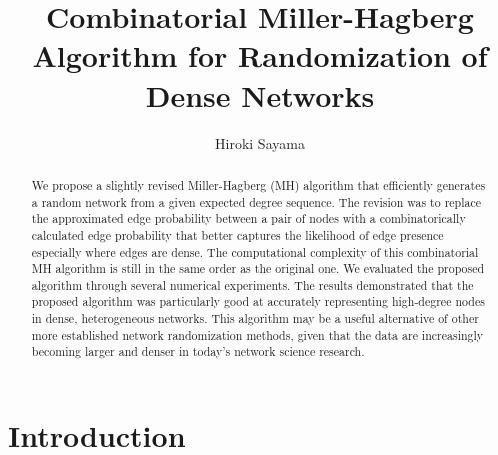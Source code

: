 \documentclass{llncs}
\begin{document}
\title{Combinatorial Miller-Hagberg Algorithm for Randomization of Dense Networks}

\author{Hiroki Sayama }

\maketitle

\setcounter{footnote}{0}

\begin{abstract}
We propose a slightly revised Miller-Hagberg (MH) algorithm that
efficiently generates a random network from a given expected degree
sequence. The revision was to replace the approximated edge
probability between a pair of nodes with a combinatorically calculated
edge probability that better captures the likelihood of edge presence
especially where edges are dense. The computational complexity of this
combinatorial MH algorithm is still in the same order as the original
one. We evaluated the proposed algorithm through several numerical
experiments. The results demonstrated that the proposed algorithm was
particularly good at accurately representing high-degree nodes in
dense, heterogeneous networks. This algorithm may be a useful
alternative of other more established network randomization methods,
given that the data are increasingly becoming larger and denser in
today's network science research.
\end{abstract}

\section{Introduction}
\end{document}
